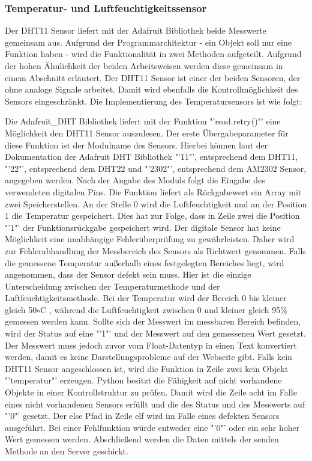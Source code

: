 \subsubsection*{Temperatur- und Luftfeuchtigkeitssensor}
	Der DHT11 Sensor liefert mit der Adafruit Bibliothek beide Messwerte gemeinsam aus. Aufgrund der Programmarchitektur - ein Objekt soll nur eine Funktion haben - wird die Funktionalität in zwei Methoden aufgeteilt. Aufgrund der hohen Ähnlichkeit der beiden Arbeitsweisen werden diese gemeinsam in einem Abschnitt erläutert. Der DHT11 Sensor ist einer der beiden Sensoren, der ohne analoge Signale arbeitet. Damit wird ebenfalls die Kontrollmöglichkeit des Sensors eingeschränkt. Die Implementierung des Temperatursensors ist wie folgt:
	
	Die Adafruit\_DHT Bibliothek liefert mit der Funktion "'read.retry()"' eine Möglichkeit den DHT11 Sensor auszulesen. Der erste Übergabeparameter für diese Funktion ist der Modulname des Sensors. Hierbei können laut der Dokumentation der Adafruit DHT Bibliothek\cite{Adafruit47:online} "'11"', entsprechend dem DHT11, "'22"', entsprechend dem DHT22 und "'2302"', entsprechend dem AM2302 Sensor, angegeben werden. Nach der Angabe des Moduls folgt die Eingabe des verwendeten digitalen Pins. Die Funktion liefert als Rückgabewert ein Array mit zwei Speicherstellen. An der Stelle 0 wird die Luftfeuchtigkeit und an der Position 1 die Temperatur gespeichert. Dies hat zur Folge, dass in Zeile zwei die Position "'1"' der Funktionsrückgabe gespeichert wird.
	Der digitale Sensor hat keine Möglichkeit eine unabhängige Fehlerüberprüfung zu gewährleisten. Daher wird zur Fehlerabhandlung der Messbereich des Sensors als Richtwert genommen. Falls die gemessene Temperatur außerhalb eines festgelegten Bereiches liegt, wird angenommen, dass der Sensor defekt sein muss. Hier ist die einzige Unterscheidung zwischen der Temperaturmethode und der Luftfeuchtigkeitsmethode. Bei der Temperatur wird der Bereich 0 bis kleiner gleich 50$\circ$C , während die Luftfeuchtigkeit zwischen 0 und kleiner gleich 95\% gemessen werden kann. Sollte sich der Messwert im messbaren Bereich befinden, wird der Status auf eine "'1"' und der Messwert auf den gemessenen Wert gesetzt. Der Messwert muss jedoch zuvor vom Float-Datentyp in einen Text konvertiert werden, damit es keine Darstellungsprobleme auf der Webseite gibt. Falls kein DHT11 Sensor angeschlossen ist, wird die Funktion in Zeile zwei kein Objekt "'temperatur"' erzeugen. Python besitzt die Fähigkeit auf nicht vorhandene Objekte in einer Kontrollstruktur zu prüfen. Damit wird die Zeile acht im Falle eines nicht vorhandenen Sensors erfüllt und die des Status und des Messwerts auf "'0"' gesetzt. Der else Pfad in Zeile elf wird im Falle eines defekten Sensors ausgeführt. Bei einer Fehlfunktion würde entweder eine "'0"' oder ein sehr hoher Wert gemessen werden. Abschließend werden die Daten mittels der senden Methode an den Server geschickt.
